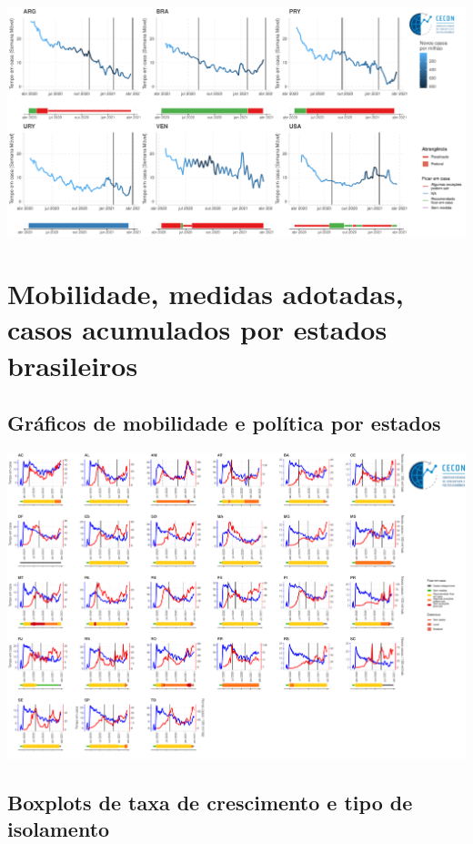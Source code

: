 \documentclass{SelfArx}
\begin{document}
\begin{center}
\includegraphics[width=.9\linewidth]{./figs/COVID/Mobilidade_Policy_selected_C6.pdf}
\end{center}




\section*{Mobilidade, medidas adotadas, casos acumulados por estados brasileiros}
\label{sec:org6476d13}

\subsection*{Gráficos de mobilidade e política por estados}
\label{sec:org192b5db}

\begin{center}
\includegraphics[width=.9\linewidth]{./figs/COVID/Estados/Mobilidade_Policy_selected_C6.pdf}
\end{center}

\subsection*{Boxplots de taxa de crescimento e tipo de isolamento}
\label{sec:org3f7ab33}
\end{document}
